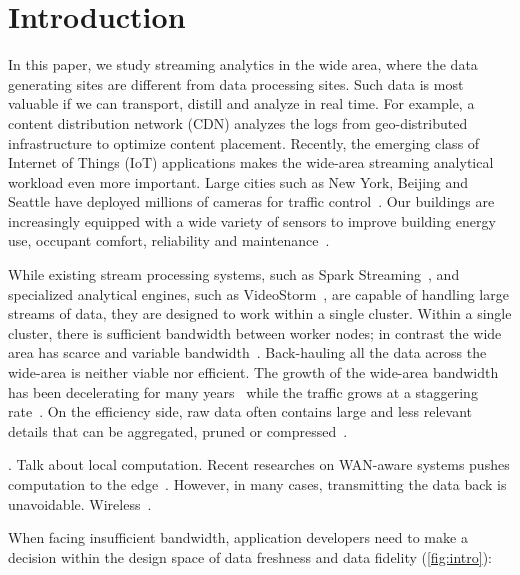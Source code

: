 \section{Introduction}

In this paper, we study streaming analytics in the wide area, where the data
generating sites are different from data processing sites. Such data is most
valuable if we can transport, distill and analyze in real time. For example, a
content distribution network (CDN) analyzes the logs from geo-distributed
infrastructure to optimize content placement. Recently, the emerging class of
Internet of Things (IoT) applications makes the wide-area streaming analytical
workload even more important. Large cities such as New York, Beijing and Seattle
have deployed millions of cameras for traffic
control~\cite{london.surveillance,skynet}. Our buildings are increasingly
equipped with a wide variety of sensors to improve building energy use, occupant
comfort, reliability and maintenance~\cite{krioukov2012building}.

While existing stream processing systems, such as Spark
Streaming~\cite{zaharia2013discretized}, and specialized analytical engines,
such as VideoStorm~\cite{zhang2017live}, are capable of handling large streams
of data, they are designed to work within a single cluster. Within a single
cluster, there is sufficient bandwidth between worker nodes; in contrast the
wide area has scarce and variable bandwidth~\cite{hsieh17gaia,
  vulimiri2015global}. Back-hauling all the data across the wide-area is neither
viable nor efficient. The growth of the wide-area bandwidth has been
decelerating for many years~\cite{global2016telegeography} while the traffic
grows at a staggering rate~\cite{index2013zettabyte}. On the efficiency side,
raw data often contains large and less relevant details that can be aggregated,
pruned or compressed~\cite{rabkin2014aggregation}.

. Talk about local computation. Recent researches
on WAN-aware systems pushes computation to the
edge~\cite{satyanarayanan2009case, rabkin2014aggregation, pu2015low}. However,
in many cases, transmitting the data back is
unavoidable. Wireless~\cite{zhang2015design, abari2017enabling}.

When facing insufficient bandwidth, application developers need to make a
decision within the design space of data freshness and data fidelity
(\autoref{fig:intro}):

